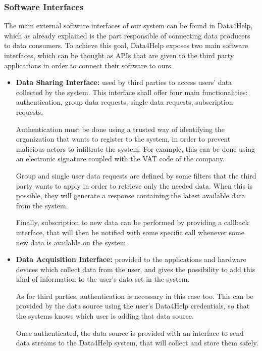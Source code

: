 \subsubsection{Software Interfaces}
The main external software interfaces of our system can be found in Data4Help, which as already explained is the part responsible of connecting data producers to data consumers.
To achieve this goal, Data4Help exposes two main software interfaces, which can be thought as APIs that are given to the third party applications in order to connect their software to ours.

\begin{itemize}
	\item \textbf{Data Sharing Interface:} used by third parties to access users' data collected by the system. This interface shall offer four main functionalities: authentication, group data requests, single data requests, subscription requests.
	
	Authentication must be done using a trusted way of identifying the organization that wants to register to the system, in order to prevent malicious actors to infiltrate the system. For example, this can be done using an electronic signature coupled with the VAT code of the company.
	
	Group and single user data requests are defined by some filters that the third party wants to apply in order to retrieve only the needed data. When this is possible, they will generate a response containing the latest available data from the system.
	
	 Finally, subscription to new data can be performed by providing a callback interface, that will then be notified with some specific call whenever some new data is available on the system.
	 
	\item \textbf{Data Acquisition Interface:} provided to the applications and hardware devices which collect data from the user, and gives the possibility to add this kind of information to the user's data set in the system.
	
	As for third parties, authentication is necessary in this case too. This can be provided by the data source using the user's Data4Help credentials, so that the systems knows which user is adding that data source.
	
	Once authenticated, the data source is provided with an interface to send data streams to the Data4Help system, that will collect and store them safely. 
\end{itemize}

